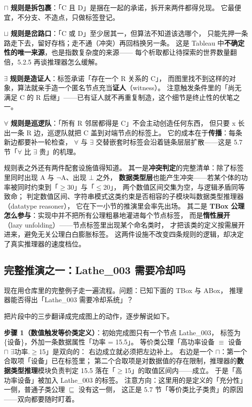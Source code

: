 \(\sqcap\) \textbf{规则是拆包裹}：「C 且 D」是捆在一起的承诺，拆开来两件都得兑现。
它最便宜，不分支、不造点，只做标签登记。

\(\sqcup\) \textbf{规则是岔路口}：「C 或 D」至少居其一，但算法不知道该选哪个，
只能先押一条路走下去，留好存档；走不通（冲突）再回档换另一条。
这是 Tableau 中\textbf{不确定性的唯一来源}，也是指数复杂度的来源——
每个析取都让待探索的世界数量翻倍，5.2.5 再谈推理器怎么缓解。

\(\exists\) \textbf{规则是造证人}：标签承诺「存在一个 R 关系的 C」，
而图里找不到这样的对象，算法就亲手造一个匿名节点充当\textbf{证人}（witness）。
注意触发条件里的「尚无满足 C 的 R 后继」——已有证人就不再重复制造，这个细节是终止性的伏笔之一。

\(\forall\) \textbf{规则是巡逻队}：「所有 R 邻居都得是 C」不会主动创造任何东西，
但只要 x 长出一条 R 边，巡逻队就把 C 盖到对端节点的标签上。
它的成本在于\textbf{传播}：每条新边都要补一轮检查，
\(\forall\) 与 \(\exists\) 交替嵌套时标签会沿着链条层层扩散——这是 5.7 节「\(\forall\) 比 \(\exists\) 贵」的机理。

规则表之外还有两件配套设施值得知道。
其一是\textbf{冲突判定}的完整清单：除了标签里同时出现 A 与 \(\lnot\)A、出现 \(\bot\) 之外，
\textbf{数据类型层}也能产生冲突——若某个体的功率被同时约束到「\(\ge\)30」与「\(\le\)20」，
两个数值区间交集为空，与逻辑矛盾同等致命；
判定数值区间、字符串模式这类约束是否相容的子模块叫数据类型推理器（datatype reasoner），
它在下一小节的推演里会率先出场。
其二是 \textbf{TBox 公理怎么参与}：实现中并不把所有公理粗暴地灌进每个节点标签，
而是\textbf{惰性展开}（lazy unfolding）——节点标签里出现某个命名类时，
才把该类的定义按需展开进来，避免无关公理白白膨胀标签。
这两件设施不改变四条规则的逻辑，却决定了真实推理器的速度档位。

\subsection{完整推演之一：Lathe\_003 需要冷却吗}

现在用仓库里的完整例子走一遍流程。问题：已知下面的 TBox 与 ABox，
推理器能否得出「Lathe\_003 需要冷却系统」？



把片段中的三步翻译成完成图上的动作，逐步解说如下。

\textbf{步骤 1（数值触发等价类定义）}：初始完成图只有一个节点 Lathe\_003，
标签为 \{设备\}，外加一条数据属性「功率 = 15.5」。
等价类公理「高功率设备 \(\equiv\) 设备 \(\sqcap\) \(\exists\)功率.\(\ge\)15」是双向的：
右边成立就必须把左边补上。
右边是一个 \(\sqcap\)：第一个合取项「设备」已在标签里；
第二个合取项是对数据值的存在限制，推理器的\textbf{数据类型推理}模块负责判定
15.5 落在「\(\ge\)15」的取值区间内——成立。
于是「高功率设备」被加入 Lathe\_003 的标签。
注意方向：这里用的是定义的「充分性」一侧，普通子类公理 \(\sqsubseteq\) 没有这一侧，
这正是 5.7 节「等价类比子类贵」的原因——双向都要随时盯着。

